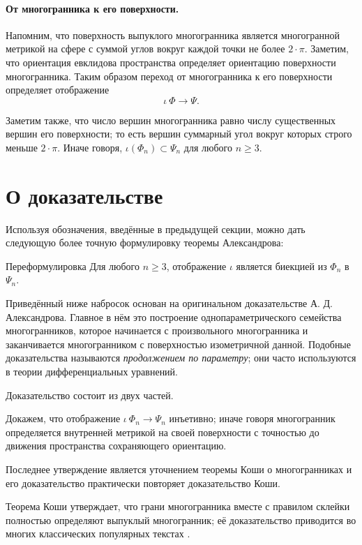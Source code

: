 \documentclass[oneside,a4paper]{article}
\begin{document}
\paragraph{От многогранника к его поверхности.}
Напомним, что поверхность выпуклого многогранника является многогранной метрикой на сфере с суммой углов вокруг каждой точки не более $2\cdot\pi$.
Заметим, что ориентация евклидова пространства определяет ориентацию поверхности многогранника.
Таким образом переход от многогранника к его поверхности определяет отображение 
\[\iota\:\Phi\to \Psi.\]

Заметим также, что число вершин многогранника равно числу существенных вершин его поверхности;
то есть вершин суммарный угол вокруг которых строго меньше $2\cdot\pi$.
Иначе говоря, $\iota(\Phi_n)\subset \Psi_n$ для любого $n\ge 3$.

\section{О доказательстве}

Используя обозначения, введённые в предыдущей секции, можно дать следующую более точную формулировку теоремы Александрова:

\begin{thm}{Переформулировка}
Для любого $n\ge 3$,
отображение $\iota$ является биекцией из $\Phi_n$ в $\Psi_n$.
\end{thm}

Приведённый ниже набросок основан на оригинальном доказательстве А. Д. Александрова.
Главное в нём это построение однопараметрического семейства многогранников, которое начинается с произвольного многогранника и заканчивается многогранником с поверхностью изометричной данной.  
Подобные доказательства называются \emph{продолжением по параметру};
они часто используются в теории дифференциальных уравнений.

\medskip

Доказательство состоит из двух частей.

 Докажем, что отображение $\iota\:\Phi_n\to\Psi_n$ инъетивно; иначе говоря многогранник определяется внутренней метрикой на своей поверхности с точностью до движения пространства сохраняющего ориентацию.

Последнее утверждение является уточнением теоремы Коши о многогранниках и его доказательство практически повторяет доказательство Коши.

Теорема Коши утверждает, что грани многогранника вместе с правилом склейки полностью определяют выпуклый многогранник;
её доказательство приводится во многих классических популярных текстах \cite{aigner-zigler,dolbilin,tabacnikov-fuks} .
\end{document}
